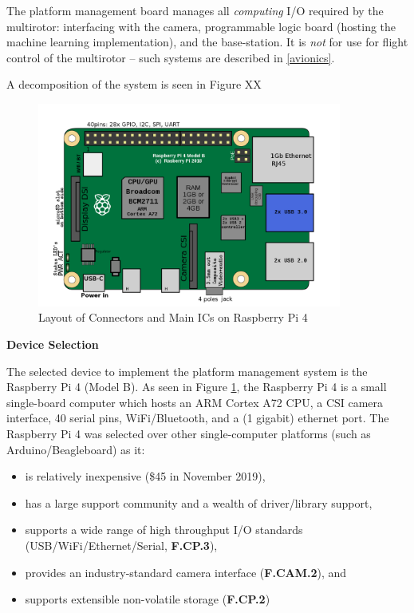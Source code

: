 The platform management board manages all \textit{computing} I/O required by the multirotor: interfacing with the camera, programmable logic board (hosting the machine learning implementation), and the base-station. It is \textit{not} for use for flight control of the multirotor -- such systems are described in \ref{avionics}.

A decomposition of the system is seen in Figure XX

\begin{figure}\label{rpi}
\centering
\includegraphics[width=10cm]{img/RaspberryPi_Model_4B.png}
\caption{Layout of Connectors and Main ICs on Raspberry Pi 4}
\end{figure}

\textbf{Device Selection}

The selected device to implement the platform management system is the Raspberry Pi 4 (Model B). As seen in Figure \ref{rpi}, the Raspberry Pi 4 is a small single-board computer which hosts an ARM Cortex A72 CPU, a CSI camera interface, 40 serial pins, WiFi/Bluetooth, and a (1 gigabit) ethernet port. The Raspberry Pi 4 was selected over other single-computer platforms (such as Arduino/Beagleboard) as it:
\begin{itemize}
\item is relatively inexpensive (\$45 in November 2019),
\item has a large support community and a wealth of driver/library support,
\item supports a wide range of high throughput I/O standards (USB/WiFi/Ethernet/Serial, \textbf{F.CP.3}),
\item provides an industry-standard camera interface (\textbf{F.CAM.2}), and
\item supports extensible non-volatile storage (\textbf{F.CP.2})\\
\end{itemize} 

